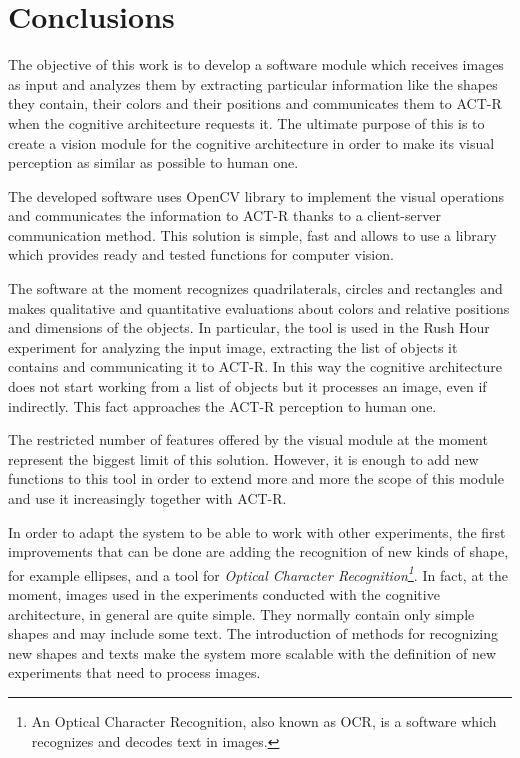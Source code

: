 \chapter{Conclusions}
	The objective of this work is to develop a software module which receives images as input and analyzes them by extracting particular information like the shapes they contain, their colors and their positions and communicates them to \mbox{ACT-R} when the cognitive architecture requests it. 
	The ultimate purpose of this is to create a vision module for the cognitive architecture in order to make its visual perception as similar as possible to human one.
	

	The developed software uses \mbox{OpenCV} library to implement the visual operations and communicates the information to \mbox{ACT-R} thanks to a client-server communication method. 
	This solution is simple, fast and allows to use a library which provides ready and tested functions for computer vision.  


	The software at the moment recognizes quadrilaterals, circles and rectangles and makes qualitative and quantitative evaluations about colors and relative positions and dimensions of the objects. 
	In particular, the tool is used in the Rush Hour experiment for analyzing the input image, extracting the list of objects it contains and communicating it to \mbox{ACT-R}. 
	In this way the cognitive architecture does not start working from a list of objects but it processes an image, even if indirectly.
	This fact approaches the \mbox{ACT-R} perception to human one. 	
		

	The restricted number of features offered by the visual module at the moment represent the biggest limit of this solution.
	However, it is enough to add new functions to this tool in order to extend more and more the scope of this module and use it increasingly together with \mbox{ACT-R}.


	In order to adapt the system to be able to work with other experiments, the first improvements that can be done are adding the recognition of new kinds of shape, for example ellipses, and a tool for \emph{{Optical Character Recognition\footnote{An Optical Character Recognition, also known as OCR, is a software which recognizes and decodes text in images.}}}.
	In fact, at the moment, images used in the experiments conducted with the cognitive architecture, in general are quite simple.
	They normally contain only simple shapes and may include some text.
	The introduction of methods for recognizing new shapes and texts make the system more scalable with the definition  of new experiments that need to process images.


